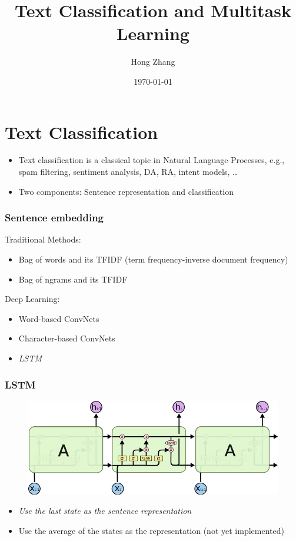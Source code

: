 \documentclass{beamer}
\title[prediction and learning]{Text Classification and Multitask Learning} %
\author{Hong Zhang} %
\institute[Yahoo!] %
{
Yahoo Researh \\ %
\medskip
}
\date{\today} %
\begin{document}
\begin{frame}
\titlepage
\end{frame}
\begin{frame}
\tableofcontents
\end{frame}

\section{Text Classification}
\begin{frame}
\begin{itemize}
\item Text classification is a classical topic in Natural Language Processes, e.g., spam filtering,
sentiment analysis,  DA, RA, intent models, \ldots
\item Two components: Sentence representation and classification 
\end{itemize}
\end{frame}



\begin{frame}
\frametitle{Sentence embedding}
Traditional Methods:
\begin{itemize}
\item Bag of words and its TFIDF (term frequency-inverse document frequency)
\item Bag of ngrams and its TFIDF
\end{itemize}
Deep Learning:
\begin{itemize}
\item Word-based ConvNets
\item Character-based ConvNets
\item {\textit{LSTM}} 
\end{itemize}

\end{frame}


\begin{frame}
\frametitle{LSTM}
\begin{figure}
\includegraphics[scale = 0.3]{LSTM.jpg}
\end{figure}
\begin{itemize}
\item \textit{Use the last state as the sentence representation} 
\item Use the average of the states as the representation (not yet implemented)
\end{itemize}

\end{frame}
\end{document}
